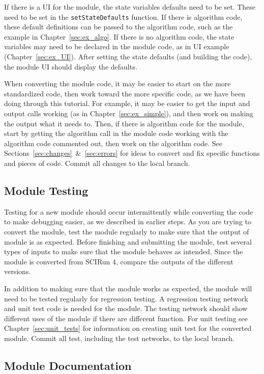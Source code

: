 \documentclass[fleqn,11pt,openany]{book}
\begin{document}
If there is a UI for the module, the state variables defaults need to be set.  
These need to be set in the \verb|setStateDefaults| function.
If there is algorithm code, these default definitions can be passed to the algorithm code, such as the example in Chapter~\ref{sec:ex_algo}.
If there is no algorithm code, the state variables may need to be declared in the module code, as in UI example (Chapter~\ref{sec:ex_UI}).
After setting the state defaults (and building the code), the module UI should display the defaults.

When converting the module code, it may be easier to start on the more standardized code, then work toward the more specific code, as we have been doing through this tutorial.  
For example, it may be easier to get the input and output calls working (as in Chapter~\ref{sec:ex_simple}), and then work on making the output what it needs to.  
Then, if there is algorithm code for the module, start by getting the algorithm call in the module code working with the algorithm code commented out, then work on the algorithm code.
See Sections~\ref{sec:changes}~\&~\ref{sec:errors} for ideas to convert and fix specific functions and pieces of code.  
Commit all changes to the local branch.

\subsection{Module Testing}

Testing for a new module should occur intermittently while converting the code to make debugging easier, as we described in earlier steps.  
As you are trying to convert the module, test the module regularly to make sure that the output of module is as expected.  
Before finishing and submitting the module, test several types of inputs to make sure that the module behaves as intended.  
Since the module is converted from SCIRun 4, compare the outputs of the different  versions.  

In addition to making sure that the module works as expected, the module will need to be tested regularly for regression testing.  
A regression testing network and unit test code is needed for the module.  
The testing network should show different uses of the module if there are different function. 
For unit testing see Chapter~\ref{sec:unit_tests} for information on creating unit test for the converted module.  
Commit all test, including the test networks, to the local branch.

\subsection{Module Documentation}
\end{document}
